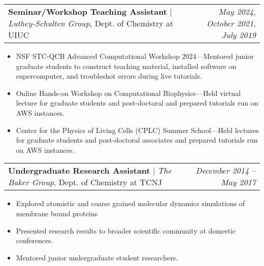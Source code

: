 \documentclass[letterpaper,10pt]{article}
\makeatletter
\newcommand{\experienceitemvspace}{3pt}
\newcommand{\resumeItem}[1]{
  \item{
    {#1 \vspace{-4pt}}
  }
}
\newcommand{\titleItem}[1]{
  \textbf{#1}
}
\newcommand{\resumeProjectHeading}[2]{
    \item
    \begin{tabular*}{0.97\textwidth}{l@{\extracolsep{\fill}}r}
      #1 & \textit{ #2} \\
    \end{tabular*}\vspace{-9pt}
}
\newcommand{\resumeItemListStart}{
\begin{itemize}}
\newcommand{\resumeItemListEnd}{
\end{itemize}\vspace{-8pt}}
\makeatother
\begin{document}

\vspace{\experienceitemvspace}
\resumeProjectHeading
{\titleItem{{Seminar/Workshop Teaching Assistant}} $|$ \emph{Luthey-Schulten Group}, Dept. of Chemistry at UIUC}{\textcolor{color2}{May 2024, October 2021, July 2019}}
\vspace{2pt}
\resumeItemListStart
\resumeItem{NSF STC-QCB Advanced Computational Workshop 2024---Mentored junior graduate students to construct teaching material, installed software on supercomputer, and troubleshot errors during live tutorials.}
\resumeItem{Online Hands-on Workshop on Computational Biophysics---Held virtual lecture for graduate students and post-doctoral and prepared tutorials run on AWS instances.}
\resumeItem{Center for the Physics of Living Cells (CPLC) Summer School---Held lectures for graduate students and post-doctoral associates and prepared tutorials run on AWS instances.}
\resumeItemListEnd


\vspace{\experienceitemvspace}
\resumeProjectHeading
{\titleItem{{Undergraduate Research Assistant}} $|$ \emph{The Baker Group}, Dept. of Chemistry at TCNJ}{\textcolor{color2}{December 2014 -- May 2017}}
\vspace{2pt}
\resumeItemListStart
\resumeItem{Explored atomistic and coarse grained molecular dynamics simulations of membrane bound proteins}
\resumeItem{Presented research results to broader scientific community at domestic conferences.}
\resumeItem{Mentored junior undergraduate student researchers.}
\resumeItemListEnd
\end{document}
